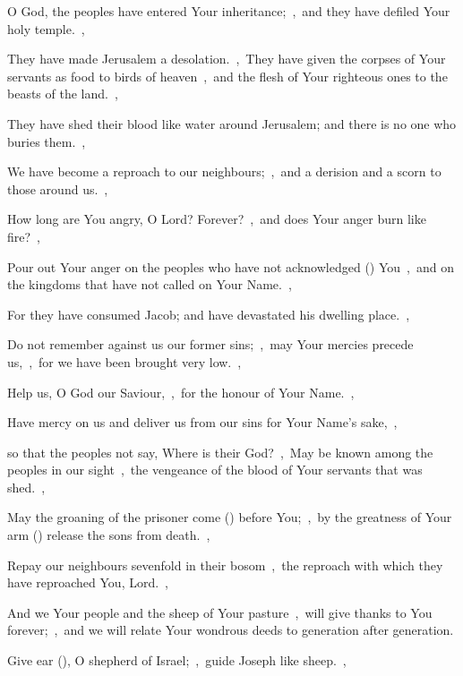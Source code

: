 \documentclass[12pt,twoside,a5paper]{article}
\begin{document}
\begin{halfparskip}
   O God, the peoples have entered Your inheritance;~\sep\ and they have defiled Your holy temple.~\sep


  They have made Jerusalem a desolation.~\sep\ They have given the corpses of Your servants as food to birds of heaven~\sep\ and the flesh of Your righteous ones to the beasts of the land.~\sep

  They have shed their blood like water around Jerusalem; and there is no one who buries them.~\sep

  We have become a reproach to our neighbours;~\sep\ and a derision and a scorn to those around us.~\sep

  How long are You angry, O Lord? Forever?~\sep\ and does Your anger burn like fire?~\sep

  Pour out Your anger on the peoples who have not acknowledged () You~\sep\ and on the kingdoms that have not called on Your Name.~\sep

  For they have consumed Jacob; and have devastated his dwelling place.~\sep

  Do not remember against us our former sins;~\sep\ may Your mercies precede us,~\sep\ for we have been brought very low.~\sep

  Help us, O God our Saviour,~\sep\ for the honour of Your Name.~\sep

  Have mercy on us and deliver us from our sins for Your Name's sake,~\sep

  so that the peoples not say, Where is their God?~\sep\ May be known among the peoples in our sight~\sep\ the vengeance of the blood of Your servants that was shed.~\sep

  May the groaning of the prisoner come () before You;~\sep\ by the greatness of Your arm () release the sons from death.~\sep

  Repay our neighbours sevenfold in their bosom~\sep\ the reproach with which they have reproached You, Lord.~\sep

  And we Your people and the sheep of Your pasture~\sep\ will give thanks to You forever;~\sep\ and we will relate Your wondrous deeds to generation after generation.

   Give ear (), O shepherd of Israel;~\sep\ guide Joseph like sheep.~\sep


\end{halfparskip}
\end{document}
